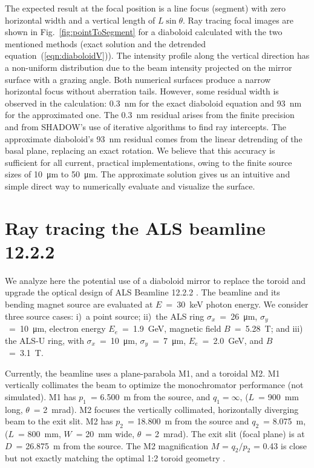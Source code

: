 \documentclass{iucr}       %
\begin{document}
The expected result at the focal position is a line focus (segment) with zero horizontal width and a vertical length of $L\sin\theta$. Ray tracing focal images are shown in Fig.~\ref{fig:pointToSegment} for a diaboloid calculated with the two mentioned methods (exact solution and the detrended equation~(\ref{eqn:diaboloidV})). The intensity profile along the vertical direction has a non-uniform distribution due to the beam intensity projected on the mirror surface with a grazing angle. Both numerical surfaces produce a narrow horizontal focus without aberration tails. However, some residual width is observed in the calculation: \SI{0.3}{\nano\meter} for the exact diaboloid equation and \SI{93}{\nano\meter} for the approximated one. The \SI{0.3}{\nano\meter} residual arises from the finite precision and from SHADOW's use of iterative algorithms to find ray intercepts.
The approximate diaboloid's \SI{93}{\nano\meter} residual comes from the linear detrending of the basal plane, replacing an exact rotation. We believe that this accuracy is sufficient for all current, practical implementations, owing to the finite source sizes of \SI{10}{\micro\meter} to \SI{50}{\micro\meter}. The approximate solution gives us an intuitive and simple direct way to numerically evaluate and visualize the surface.

\section{Ray tracing the ALS beamline 12.2.2}
\label{sec:beamline}

We analyze here the potential use of a diaboloid mirror to replace the toroid and upgrade the optical design of ALS Beamline 12.2.2 \cite{bl1222,MacDowell2004}. The beamline and its bending magnet source are evaluated at $E$~=~\SI{30}{\kilo\electronvolt} photon energy. We consider three source cases: i)~a point source; ii)~the ALS ring
$\sigma_x$~=~\SI{26}{\micro\meter}, $\sigma_y$~=~\SI{10}{\micro\meter}, 
electron energy $E_e$~=~\SI{1.9}{\giga\electronvolt}, magnetic field $B$~=~\SI{5.28}{\tesla}; and iii) the ALS-U ring, with $\sigma_x$~=~\SI{10}{\micro\meter}, $\sigma_y$~=~\SI{7}{\micro\meter}, $E_e$~=~\SI{2.0}{\giga\electronvolt}, and $B$~=~\SI{3.1}{\tesla}. 

Currently, the beamline uses a plane-parabola M1, and a toroidal M2. M1 vertically collimates the beam to optimize the monochromator performance (not simulated). M1 has $p_1$~= \SI{6.500}{\meter} from the source, and $q_1=\infty$, ($L$~= \SI{900}{\milli\meter} long, $\theta$~= \SI{2}{\milli\radian}). M2 focuses the vertically collimated, horizontally diverging beam to the exit slit. M2 has $p_2$~= \SI{18.800}{\meter} from the source and $q_2$~= \SI{8.075}{\meter}, ($L$~= \SI{800}{\milli\meter}, $W$~= \SI{20}{\milli\meter} wide, $\theta$~= \SI{2}{\milli\radian}). The exit slit (focal plane) is at $D$~= \SI{26.875}{\meter} from the source. The M2 magnification $M$ = $q_2/p_2$ = 0.43 is close but not exactly matching the optimal 1:2 toroid geometry \cite{MacDowell2004}.
\end{document}
